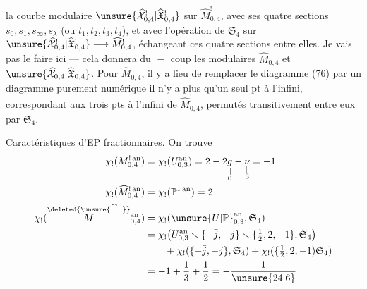 la courbe modulaire $\unsure{\widehat{\mathcal X}^!_{0,4}|\widehat{\mathfrak X}^!_{0,4}}$ sur $\widehat M^!_{0,4}$, avec ses quatre sections $s_0,s_1,s_\infty,s_\lambda$ (ou $t_1,t_2,t_3,t_4$), et avec l'opération de $\mathfrak S_4$  sur $\unsure{\widehat{\mathcal X}^!_{0,4}|\widehat{\mathfrak X}^!_{0,4}}\longrightarrow\widehat M^!_{0,4}$, échangeant ces quatre sections entre elles. Je vais pas le faire ici --- cela donnera du $=$ coup les  modulaires $\widehat M_{0,4}$ et $\unsure{\widehat{\mathcal X}_{0,4}|\widehat{\mathfrak X}_{0,4}}$. Pour $\widehat M_{0,4}$, il y a lieu de remplacer le diagramme (76) par un diagramme purement numérique
il n'y a plus qu'un seul pt à l'infini, correspondant aux trois pts à l'infini de $\widehat M^!_{0,4}$, permutés transitivement entre eux par $\mathfrak S_4$.

Caractéristiques d'EP fractionnaires. On trouve
\[
\begin{aligned}
\chi_!(M^{!\,\mathrm{an}}_{0,4})&=\chi_!(U^{\mathrm{an}}_{0,3})=2-2\underset{\substack{\Vert\\0}}{g}-\underset{\substack{\Vert\\3}}{\nu}=-1\\
\chi_!(\widehat M^{!\,\mathrm{an}}_{0,4})&=\chi_!(\mathbb P^{1\,\mathrm{an}})=2\\
\chi_!(\overset{\deleted{\unsure{\widehat{\phantom M}\,!}}}{M}{}^{\mathrm{an}}_{0,4})&=\chi_!(\unsure{U|\mathbb P}^{\mathrm{an}}_{0,3},\mathfrak S_4)\\
&=\chi_!\bigl(U^{\mathrm{an}}_{0,3}\smallsetminus\{-\bar j,-j\}\smallsetminus\{\tfrac12,2,-1\},\mathfrak S_4\bigr)\\
&\qquad+\chi_!(\{-\bar j,-j\},\mathfrak S_4)+\chi_!(\{\tfrac12,2,-1)\mathfrak S_4)\\
&=-1+\frac13+\frac12=-\frac1{\unsure{24|6}}
\end{aligned}
\]

